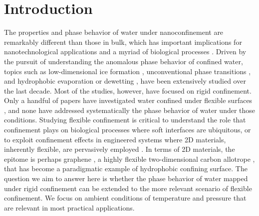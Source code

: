 \documentclass[journal=acsnano,manuscript=article]{achemso}
\begin{document}
\section{Introduction}
The properties and phase behavior of water under nanoconfinement are remarkably different than those in bulk, which has important implications for nanotechnological applications and a myriad of biological processes \cite{Lucent2007, Holt2006, Levinger2002, Nair2012}. Driven by the pursuit of understanding the anomalous phase behavior of confined water, topics such as low-dimensional ice formation \cite{Algara-Siller2015, Zhou2015, Koga2001}, unconventional phase transitions \cite{Mochizuki2015,Han2010,Giovambattista2009,Zhu2015}, and hydrophobic evaporation or dewetting \cite{Sharma2012,Altabet2017,Head-Gordon2008,Hummer2001}, have been extensively studied over the last decade. Most of the studies, however, have focused on rigid confinement. Only a handful of papers have investigated water confined under flexible surfaces \cite{Algara-Siller2015,Deshmukh2014,Altabet2017}, and none have addressed systematically the phase behavior of water under those conditions. Studying flexible confinement is critical to understand the role that confinement plays on biological processes where soft interfaces are ubiquitous, or to exploit confinement effects in engineered systems where 2D materials, inherently flexible, are pervasively employed \cite{Deng2016}. In terms of 2D materials, the epitome is perhaps graphene \cite{Geim2007}, a highly flexible two-dimensional carbon allotrope \cite{Wei2013,Fasolino2007}, that has become a paradigmatic example of hydrophobic confining surface. The question we aim to answer here is whether the phase behavior of water mapped under rigid confinement can be extended to the more relevant scenario of flexible confinement. We focus on ambient conditions of temperature and pressure that are relevant in most practical applications.
	
\end{document}
